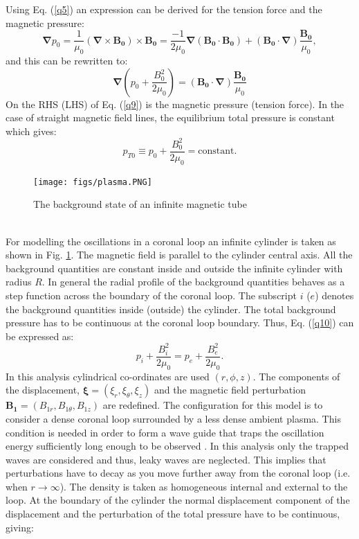 \documentclass[12pt,a4paper,twoside]{article}
\begin{document}
Using Eq. (\ref{q5}) an expression can be derived for the tension force and the magnetic pressure:
\begin{equation}
\boldsymbol{ \nabla} p_0 = \frac{1}{ \mu_0 } \left(  \boldsymbol{\nabla} \times \boldsymbol{B_0} \right) \times \boldsymbol{B_0} = \frac{-1}{ 2 \mu_0 }   \boldsymbol{\nabla} \left(  \boldsymbol{B_0} \cdot \boldsymbol{B_0} \right)+ (\boldsymbol{B_0} \cdot \boldsymbol{\nabla}) \frac{\boldsymbol{B_0}}{\mu_0} ,
\end{equation} 
and this can be rewritten to:
\begin{equation} \label{q9}
\boldsymbol{ \nabla} \left( p_0 + \frac{B_0^2}{ 2 \mu_0 }  \right) =  (\boldsymbol{B_0} \cdot \boldsymbol{\nabla}) \frac{\boldsymbol{B_0}}{\mu_0}
\end{equation} 
On the RHS (LHS) of Eq. (\ref{q9}) is the magnetic pressure (tension force). In the case of straight magnetic field lines, the equilibrium total pressure is constant which gives:
\begin{equation} \label{q10}
p_{T0} \equiv p_0 +  \frac{B_0^2}{ 2 \mu_0 } = \mbox{constant} . 
\end{equation}   
\begin{figure}
\centering
\texttt{[image: figs/plasma.PNG]}
\caption{The background state of an infinite magnetic tube \citep{Ruderman2009}}
\label{fig_3}
\end{figure} \\
For modelling the oscillations in a coronal loop an infinite cylinder is taken as shown in Fig. \ref{fig_3}. The magnetic field is parallel to the cylinder central axis. All the background quantities are constant inside and outside the infinite cylinder with radius $R$. In general the radial profile of the background quantities  behaves as a step function across the boundary of the coronal loop. The subscript $i$ ($e$) denotes the background quantities inside (outside) the cylinder. The total background pressure has to be continuous at the coronal loop boundary. Thus, Eq. (\ref{q10}) can be expressed as:
\begin{equation}
p_i +  \frac{B_i^2}{ 2 \mu_0 } = p_e +  \frac{B_e^2}{ 2 \mu_0 } .
\end{equation}        
In this analysis cylindrical co-ordinates are used $(r, \phi, z)$. The components of the displacement, $\boldsymbol{\xi} = (\xi_r,\xi_{\theta},\xi_z) $ and the magnetic field perturbation $\boldsymbol{B_1} = (B_{1r}, B_{1 \theta},B_{1z})$ are redefined. The configuration for this model is to consider a dense coronal loop surrounded by a less dense ambient plasma. This condition is needed in order to form a wave guide that traps the oscillation energy sufficiently long enough to be observed \citep{Van_Doorsselaere2008}. In this analysis only the trapped waves are considered and thus, leaky waves are neglected. This implies that perturbations have to decay as you move further away from the coronal loop (i.e. when $r \rightarrow \infty$). The density is taken as homogeneous internal and external to the loop. At the boundary of the cylinder the normal displacement component of the displacement and the perturbation of the total pressure have to be continuous, giving:
\end{document}
